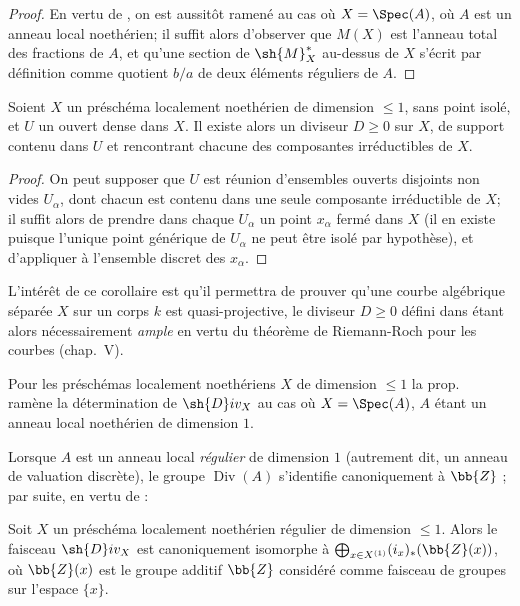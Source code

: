 \begin{proof}
En vertu de , on est aussitôt ramené au cas où $X=\Spec(A)$, où $A$ est un anneau local noethérien;
il suffit alors d'observer que $M(X)$ est l'anneau total des fractions de $A$, et qu'une section de $\sh{M}^*_X$ au-dessus de $X$ s'écrit par définition comme quotient $b/a$ de deux éléments réguliers de $A$.
\end{proof}

\begin{corollary}[21.9.7]
\label{IV.21.9.7}
Soient $X$ un préschéma localement noethérien de dimension $\leq1$, sans point isolé, et $U$ un ouvert dense dans $X$.
Il existe alors un diviseur $D\geq0$ sur $X$, de support contenu dans $U$ et rencontrant chacune des composantes irréductibles de $X$.
\end{corollary}

\begin{proof}
On peut supposer que $U$ est réunion d'ensembles ouverts disjoints non vides $U_\alpha$, dont chacun est contenu dans une seule composante irréductible de $X$;
il suffit alors de prendre dans chaque $U_\alpha$ un point $x_\alpha$ fermé dans $X$ (il en existe puisque l'unique point générique de $U_\alpha$ ne peut être isolé par hypothèse), et d'appliquer  à l'ensemble discret des $x_\alpha$.
\end{proof}

L'intérêt de ce corollaire est qu'il permettra de prouver qu'une courbe algébrique séparée $X$ sur un corps $k$ est quasi-projective, le diviseur $D\geq0$ défini dans  étant alors nécessairement \emph{ample} en vertu du théorème de Riemann-Roch pour les courbes (chap.~V).

\begin{env}[21.9.8]
\label{IV.21.9.8}
Pour les préschémas localement noethériens $X$ de dimension $\leq1$ la prop.~ ramène la détermination de $\sh{D}iv_X$ au cas où $X=\Spec(A)$, $A$ étant un anneau local noethérien de dimension $1$.

Lorsque $A$ est un anneau local \emph{régulier} de dimension $1$ (autrement dit, un anneau de valuation discrète), le groupe $\operatorname{Div}(A)$ s'identifie canoniquement à $\bb{Z}$ ;
par suite, en vertu de :
\end{env}

\begin{proposition}[21.9.9]
\label{IV.21.9.9}
Soit $X$ un préschéma localement noethérien \textup{régulier} de dimension $\leq1$.
Alors le faisceau $\sh{D}iv_X$ est canoniquement isomorphe à $\bigoplus_{x\in X^{(1)}}(i_x)_*(\bb{Z}(x))$, où $\bb{Z}(x)$ est le groupe additif $\bb{Z}$ considéré comme faisceau de groupes sur l'espace $\{x\}$.
\end{proposition}

